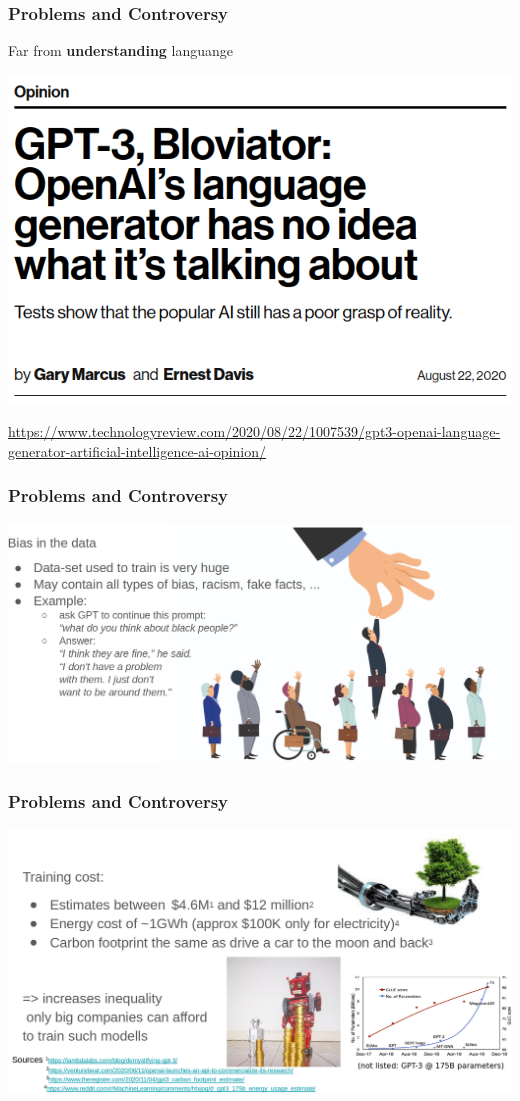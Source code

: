 \documentclass[10pt]{beamer}
\begin{document}
\begin{frame}
  \frametitle{Problems and Controversy}
Far from \textbf{understanding} languange
\begin{center}
	\includegraphics[width=.5\columnwidth]{images/pr1}
\end{center}
\vspace{.25cm}
\scriptsize{
\url{https://www.technologyreview.com/2020/08/22/1007539/gpt3-openai-language-generator-artificial-intelligence-ai-opinion/
}}
\end{frame}





\begin{frame}
  \frametitle{Problems and Controversy}
\begin{center}
	\includegraphics[width=\columnwidth]{images/pr2}
\end{center}
\end{frame}

\begin{frame}
  \frametitle{Problems and Controversy}
\begin{center}
	\includegraphics[width=\columnwidth]{images/pr3}
\end{center}
\end{frame}
\end{document}
